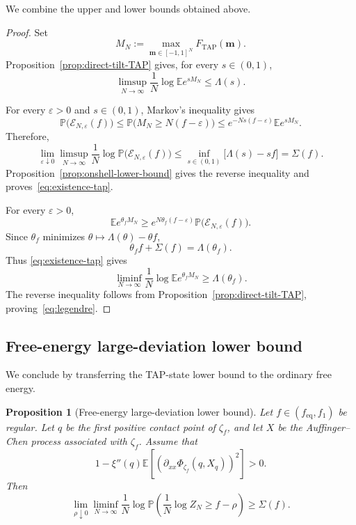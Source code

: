 \documentclass[a4paper,10pt,reqno]{amsart}
\numberwithin{equation}{section}
\newtheorem{proposition}{Proposition}[section]
\newcommand{\ve}{\varepsilon}
\newcommand{\dP}{\mathbb{P}}%
\newcommand{\dE}{\mathbb{E}}%
\newcommand{\mc}{\mathcal}
\newcommand{\TAP}{\mathrm{TAP}}
\newcommand{\eq}{\mathrm{eq}}
\newcommand{\bfm}{\mathbf{m}}
\begin{document}
	We combine the upper and lower bounds obtained above.
	
	\begin{proof}
		Set
		\[
		M_N:=\max_{\bfm\in[-1,1]^N}F_{\TAP}(\bfm).
		\]
		Proposition~\ref{prop:direct-tilt-TAP} gives, for every
		\(s\in(0,1)\),
		\[
		\limsup_{N\to\infty}
		\frac1N\log\dE e^{sM_N}
		\le\Lambda(s).
		\]
		
		For every \(\ve>0\) and \(s\in(0,1)\), Markov's inequality gives
		\[
		\dP\bigl(\mc E_{N,\ve}(f)\bigr)
		\le
		\dP\bigl(M_N\ge N(f-\ve)\bigr)
		\le
		e^{-Ns(f-\ve)}\dE e^{sM_N}.
		\]
		Therefore,
		\[
		\lim_{\ve\downarrow0}
		\limsup_{N\to\infty}
		\frac1N\log\dP\bigl(\mc E_{N,\ve}(f)\bigr)
		\le
		\inf_{s\in(0,1)}
		\bigl[\Lambda(s)-sf\bigr]
		=
		\Sigma(f).
		\]
		Proposition~\ref{prop:onshell-lower-bound} gives the reverse
		inequality and proves~\eqref{eq:existence-tap}.
		
		For every \(\ve>0\),
		\[
		\dE e^{\theta_fM_N}
		\ge
		e^{N\theta_f(f-\ve)}
		\dP\bigl(\mc E_{N,\ve}(f)\bigr).
		\]
		Since \(\theta_f\) minimizes
		\(\theta\mapsto\Lambda(\theta)-\theta f\),
		\[
		\theta_f f+\Sigma(f)=\Lambda(\theta_f).
		\]
		Thus \eqref{eq:existence-tap} gives
		\[
		\liminf_{N\to\infty}
		\frac1N\log\dE e^{\theta_fM_N}
		\ge\Lambda(\theta_f).
		\]
		The reverse inequality follows from
		Proposition~\ref{prop:direct-tilt-TAP}, proving~\eqref{eq:legendre}.
	\end{proof}
	
	\subsection{Free-energy large-deviation lower bound}
	
	We conclude by transferring the TAP-state lower bound to the ordinary free
	energy.
	
	\begin{proposition}[Free-energy large-deviation lower bound]
		\label{prop:free-energy-ldp-lower-bound}
		Let \(f\in(f_{\eq},f_1)\) be regular. Let \(q\) be the first
		positive contact point of \(\zeta_f\), and let \(X\) be the
		Auffinger--Chen process
		associated with \(\zeta_f\). Assume that
		\[
		1-\xi''(q)\dE\left[
		\left(
		\partial_{xx}\Phi_{\zeta_f}(q,X_q)
		\right)^2
		\right]>0.
		\]
		Then
		\[
		\lim_{\rho\downarrow0}\liminf_{N\to\infty}
		\frac1N\log\dP\left(
		\frac1N\log Z_N\ge f-\rho
		\right)
		\ge \Sigma(f).
		\]
	\end{proposition}
	
\end{document}

